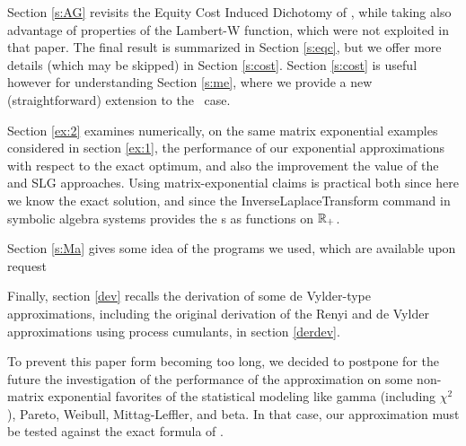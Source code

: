 Section \ref{s:AG}  revisits the Equity Cost Induced Dichotomy of \cite{AGLW}, while taking also advantage of properties of the Lambert-W function, which were not exploited in that paper. The final result is summarized in Section \ref{s:eqc}, but we offer more details (which may be skipped) in Section \ref{s:cost}. Section \ref{s:cost} is useful however for understanding  Section \ref{s:me}, where we  provide a new (straightforward) extension   to the \me\ case. %

Section \ref{ex:2} examines  numerically, on   the same matrix exponential examples considered in section \ref{ex:1},   the performance of our exponential approximations with respect to the exact optimum, and also the improvement  \wrt the value of the \deF and SLG approaches.  Using matrix-exponential claims is practical both since here we know the exact solution, and since the
InverseLaplaceTransform command in symbolic algebra systems provides
the \sf s as functions on ${\mathbb R}_+$.



Section \ref{s:Ma} gives some idea of the programs we used, which are available upon request

Finally, section \ref{dev} recalls the derivation of some  de Vylder-type approximations, including the  original derivation of the Renyi and de Vylder approximations using  process cumulants, in section \ref{derdev}.

To prevent this paper form becoming too long, we decided to postpone for the future the investigation of the performance of the approximation  on  some non-matrix exponential favorites of the  statistical modeling like   gamma (including $\chi^2$), Pareto, Weibull, Mittag-Leffler, and beta.
In that case, our approximation must be tested against the exact formula of \cite{Gaj}.






